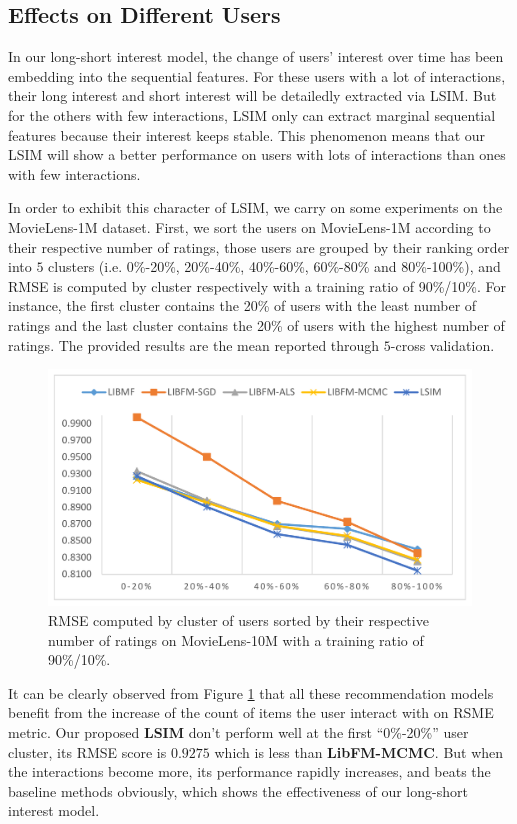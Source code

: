 \documentclass{llncs}
\begin{document}
\subsection{Effects on Different Users}
In our long-short interest model, the change of users' interest over time has been
embedding into the sequential features. For these users with a lot of interactions,
their long interest and short interest will be detailedly extracted via LSIM.
But for the others with few interactions, LSIM only can extract marginal
sequential features because their interest keeps stable.
This phenomenon means that our LSIM will show a better performance on users with
lots of interactions than ones with few interactions.

In order to exhibit this character of LSIM,
we carry on some experiments on the MovieLens-1M dataset.
First, we sort the users on MovieLens-1M according to their respective number
of ratings, those users are grouped by their ranking order into $5$  
clusters (i.e. 0\%-20\%, 20\%-40\%, 40\%-60\%, 60\%-80\% and 80\%-100\%),
and RMSE is computed by cluster respectively with a training ratio of 90\%/10\%.
For instance, the first cluster contains the 20\% of users with the least
number of ratings and the last cluster contains the 20\% of users with the
highest number of ratings.
The provided results are the mean reported through $5$-cross validation.

\begin{figure}[htbp]
	\centering
	\includegraphics[scale=0.3]{images/rank_rmse.pdf}
	\caption{RMSE computed by cluster of users sorted by their respective number
		of ratings on MovieLens-10M with a training ratio of 90\%/10\%.}
	\label{fig:rank_rsme}
\end{figure}

It can be clearly observed from Figure \ref{fig:rank_rsme} that all these recommendation models
benefit from the increase of the count of items the user interact with on RSME metric.
Our proposed \textbf{LSIM} don't perform well at the first ``0\%-20\%'' user cluster,
its RMSE score is $0.9275$ which is less than \textbf{LibFM-MCMC}.
But when the interactions become more, its performance rapidly increases,
and beats the baseline methods obviously, which shows the effectiveness of our
long-short interest model.
\end{document}
